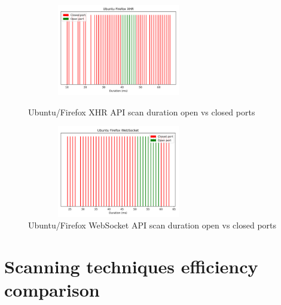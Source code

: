 \begin{figure}[ht]
\centering
\begin{minipage}{.45\textwidth}
  \centering
\includegraphics[width=8cm, height=4cm, keepaspectratio]{port_scanning_techniques/img/ubuntu_Firefox_efficacy_xhr.png}
    \caption{Ubuntu/Firefox XHR API scan duration open vs closed ports}
    \label{fig:ubuntu-firefox-xhr}
\end{minipage}
\hspace{0.5cm} %
\begin{minipage}{.45\textwidth}
\includegraphics[width=8cm, height=4cm, keepaspectratio]{port_scanning_techniques/img/ubuntu_Firefox_efficacy_websocket.png}
    \caption{Ubuntu/Firefox WebSocket API scan duration open vs closed ports}
    \label{fig:ubuntu-firefox-websocket}
\end{minipage}
\end{figure}
\clearpage

\section{Scanning techniques efficiency comparison}
\label{appendix:efficiency-comparison}

